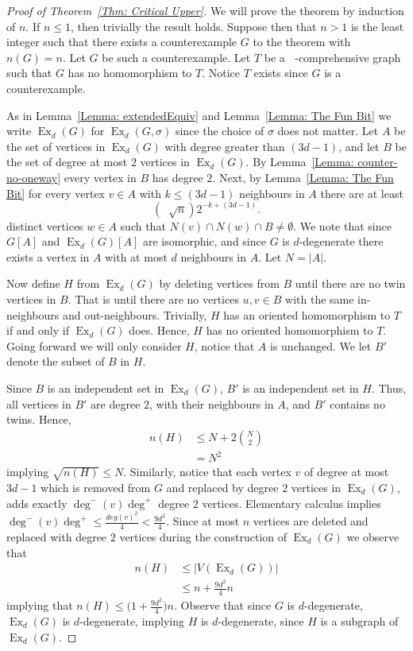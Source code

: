 \documentclass[10pt,a4paper]{amsart}
\DeclareMathOperator{\bound}{\Big( 3d-1, \coe\sqrt{n}\Big)}
\DeclareMathOperator{\coe}{6\Big(1+\frac{9d^2}{4}\Big)^{\frac{1}{2}}d}
\DeclareMathOperator{\ex}{\text{Ex}}
\begin{document}
\begin{proof}[Proof of Theorem~\ref{Thm: Critical Upper}]

We will prove the theorem by induction of $n$.
If $n\leq 1$, then trivially the result holds.
Suppose then that $n>1$ is the least integer such that
there exists a counterexample $G$ to the theorem with $n(G) = n$.
Let $G$ be such a counterexample.
Let $T$ be a $\bound$-comprehensive graph
such that $G$ has no homomorphism to $T$.
Notice $T$ exists since $G$ is a counterexample.

As in Lemma~\ref{Lemma: extendedEquiv} and Lemma~\ref{Lemma: The Fun Bit}
we write $\ex_d(G)$ for $\ex_d(G,\sigma)$ since the choice of $\sigma$ does not matter.
Let $A$ be the set of vertices in $\ex_d(G)$ with degree greater than $(3d-1)$,
and let $B$ be the set of degree at most $2$ vertices in $\ex_d(G)$.
By Lemma~\ref{Lemma: counter-no-oneway} every vertex in $B$ has degree $2$.
Next, 
by Lemma~\ref{Lemma: The Fun Bit} for every vertex $v \in A$ with $k \leq (3d-1)$ neighbours in 
$A$
there are at least
    \[
    (\coe\sqrt{n})2^{-k+(3d-1)}.
    \]
distinct vertices $w\in A$ such that $N(v)\cap N(w)\cap B \neq \emptyset$.
We note that since $G[A]$ and $\ex_d(G)[A]$ are isomorphic,
and since $G$ is $d$-degenerate there exists a vertex in $A$ with at most $d$ neighbours in $A$.
Let $N = |A|$.

Now define $H$ from $\ex_d(G)$ by deleting vertices from $B$ until there are no twin vertices in $B$.
That is until there are no vertices $u,v \in B$ with the same in-neighbours and out-neighbours.
Trivially, $H$ has an oriented homomorphism to $T$ if and only if $\ex_d(G)$ does.
Hence, $H$ has no oriented homomorphism to $T$.
Going forward we will only consider $H$, notice that $A$ is unchanged.
We let $B'$ denote the subset of $B$ in $H$.

Since $B$ is an independent set in $\ex_d(G)$, $B'$ is an independent set in $H$.
Thus, all vertices in $B'$ are degree $2$, with their neighbours in $A$, and $B'$ contains no twins.
Hence, 
\begin{align*}
    n(H) & \leq N +2\binom{N}{2}\\
    & = N^2
\end{align*}
implying $\sqrt{n(H)} \leq N$.
Similarly, notice that each vertex $v$ of degree at most $3d-1$ which is 
removed from $G$ and replaced by degree $2$ vertices in $\ex_d(G)$, 
adds exactly $\deg^-(v)\deg^+$ degree $2$ vertices.
Elementary calculus implies $\deg^-(v)\deg^+\leq \frac{deg(v)^2}{4} < \frac{9d^2}{4}$. 
Since at most $n$ vertices are deleted and replaced with degree $2$ vertices 
during the construction of $\ex_d(G)$ we observe that
\begin{align*}
    n(H) & \leq |V(\ex_d(G))| \\
    & \leq n + \frac{9d^2}{4}n
\end{align*}
implying that $n(H) \leq \Big(1+\frac{9d^2}{4}\Big)n$.
Observe that since $G$ is $d$-degenerate, $\ex_d(G)$ is $d$-degenerate, implying $H$ is $d$-degenerate, 
since $H$ is a subgraph of $\ex_d(G)$.



\end{proof}
\end{document}
